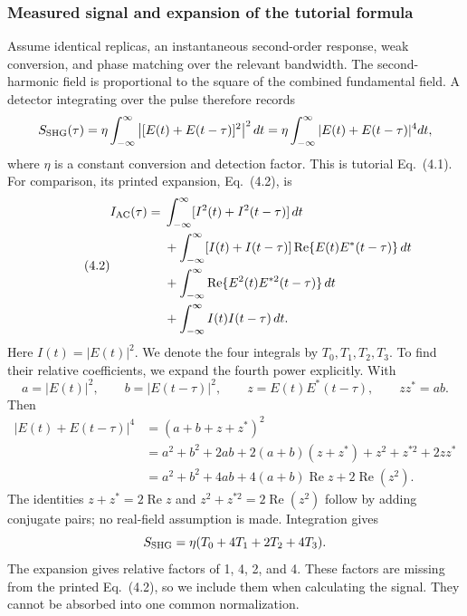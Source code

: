 \subsubsection{Measured signal and expansion of the tutorial formula}
Assume identical replicas, an instantaneous second-order response, weak conversion, and phase matching over the relevant bandwidth. The second-harmonic field is proportional to the square of the combined fundamental field. A detector integrating over the pulse therefore records
\begin{equation}
S_{\rm SHG}(\tau)=\eta\int_{-\infty}^{\infty}
\left|[E(t)+E(t-\tau)]^2\right|^2dt
=\eta\int_{-\infty}^{\infty}|E(t)+E(t-\tau)|^4dt,
\end{equation}
where $\eta$ is a constant conversion and detection factor. This is tutorial Eq.~(4.1). For comparison, its printed expansion, Eq.~(4.2), is
\begin{equation}\tag{4.2}\label{eq:tutorial-iac}
\begin{aligned}
I_{\rm AC}(\tau)={}&\int_{-\infty}^{\infty}[I^2(t)+I^2(t-\tau)]\,dt\\
&+\int_{-\infty}^{\infty}[I(t)+I(t-\tau)]
\operatorname{Re}\{E(t)E^*(t-\tau)\}\,dt\\
&+\int_{-\infty}^{\infty}\operatorname{Re}\{E^2(t)E^{*2}(t-\tau)\}\,dt\\
&+\int_{-\infty}^{\infty}I(t)I(t-\tau)\,dt .
\end{aligned}
\end{equation}
Here $I(t)=|E(t)|^2$. We denote the four integrals by $T_0,T_1,T_2,T_3$. To find their relative coefficients, we expand the fourth power explicitly. With
\begin{equation}
a=|E(t)|^2,\qquad b=|E(t-\tau)|^2,\qquad
z=E(t)E^*(t-\tau),\qquad zz^*=ab.
\end{equation}
Then
\begin{align}
|E(t)+E(t-\tau)|^4
&=(a+b+z+z^*)^2\\
&=a^2+b^2+2ab+2(a+b)(z+z^*)+z^2+z^{*2}+2zz^*\\
&=a^2+b^2+4ab+4(a+b)\operatorname{Re}z
+2\operatorname{Re}(z^2).
\end{align}
The identities $z+z^*=2\operatorname{Re}z$ and $z^2+z^{*2}=2\operatorname{Re}(z^2)$ follow by adding conjugate pairs; no real-field assumption is made. Integration gives
\begin{equation}\label{eq:corrected-iac}
S_{\rm SHG}=\eta(T_0+4T_1+2T_2+4T_3).
\end{equation}
The expansion gives relative factors of 1, 4, 2, and 4. These factors are missing from the printed Eq.~(4.2), so we include them when calculating the signal. They cannot be absorbed into one common normalization.

